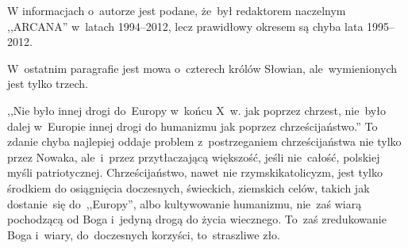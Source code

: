 \documentclass[a4paper,11pt]{article}
\begin{document}

\vspace{\spaceTwo}








\start {} W informacjach o~autorze jest podane,
że~był redaktorem naczelnym ,,ARCANA'' w~latach 1994--2012, lecz
prawidłowy okresem są chyba lata 1995--2012.

\vspace{\spaceFour}


\start {} W~ostatnim paragrafie jest mowa o~czterech królów
Słowian, ale~wymienionych jest tylko trzech.

\vspace{\spaceFour}


\start {} ,,Nie było innej drogi do~Europy w~końcu X~w.
jak poprzez chrzest, nie~było dalej w~Europie innej drogi do humanizmu
jak poprzez chrześcijaństwo.'' To zdanie chyba najlepiej oddaje
problem z~postrzeganiem chrześcijaństwa nie tylko przez Nowaka,
ale~i~przez przytłaczającą większość, jeśli nie~całość, polskiej myśli
patriotycznej. Chrześcijaństwo, nawet nie rzymski\dywiz katolicyzm,
jest tylko środkiem do osiągnięcia doczesnych, świeckich, ziemskich
celów, takich jak dostanie~się do~,,Europy'', albo kultywowanie
humanizmu, nie~zaś wiarą pochodzącą od Boga i~jedyną drogą do życia
wiecznego. To~zaś zredukowanie Boga i~wiary, do~doczesnych korzyści,
to~straszliwe zło.

\vspace{\spaceFour}
\end{document}
